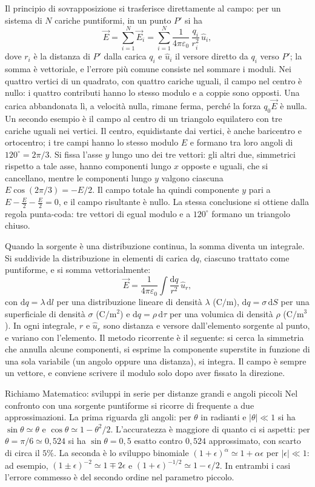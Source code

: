 \documentclass[11pt,a4paper]{article}
\newcommand{\dd}{\mathrm{d}}
\newcommand{\epz}{\varepsilon_0}
\newcommand{\Ev}{\vec{E}}
\newcommand{\uv}{\hat{u}}
\begin{document}
Il principio di sovrapposizione si trasferisce direttamente al campo: per un sistema di $N$ cariche puntiformi, in un punto $P'$ si ha
\[
\Ev=\sum_{i=1}^{N}\Ev_i=\sum_{i=1}^{N}\frac{1}{4\pi\epz}\,\frac{q_i}{r_i^2}\,\uv_i ,
\]
dove $r_i$ è la distanza di $P'$ dalla carica $q_i$ e $\uv_i$ il versore diretto da $q_i$ verso $P'$; la somma è vettoriale, e l'errore più comune consiste nel sommare i moduli. Nei quattro vertici di un quadrato, con quattro cariche uguali, il campo nel centro è nullo: i quattro contributi hanno lo stesso modulo e a coppie sono opposti. Una carica abbandonata lì, a velocità nulla, rimane ferma, perché la forza $q_0\Ev$ è nulla. Un secondo esempio è il campo al centro di un triangolo equilatero con tre cariche uguali nei vertici. Il centro, equidistante dai vertici, è anche baricentro e ortocentro; i tre campi hanno lo stesso modulo $E$ e formano tra loro angoli di $120^{\circ}=2\pi/3$. Si fissa l'asse $y$ lungo uno dei tre vettori: gli altri due, simmetrici rispetto a tale asse, hanno componenti lungo $x$ opposte e uguali, che si cancellano, mentre le componenti lungo $y$ valgono ciascuna $E\cos(2\pi/3)=-E/2$. Il campo totale ha quindi componente $y$ pari a $E-\tfrac E2-\tfrac E2=0$, e il campo risultante è nullo. La stessa conclusione si ottiene dalla regola punta-coda: tre vettori di egual modulo e a $120^{\circ}$ formano un triangolo chiuso.

Quando la sorgente è una distribuzione continua, la somma diventa un integrale. Si suddivide la distribuzione in elementi di carica $\dd q$, ciascuno trattato come puntiforme, e si somma vettorialmente:
\[
\Ev=\frac{1}{4\pi\epz}\int \frac{\dd q}{r^2}\,\uv_r ,
\]
con $\dd q=\lambda\,\dd l$ per una distribuzione lineare di densità $\lambda$ ($\ensuremath{\mathrm{C/m}}$), $\dd q=\sigma\,\dd S$ per una superficiale di densità $\sigma$ ($\ensuremath{\mathrm{C/m^2}}$) e $\dd q=\rho\,\dd\tau$ per una volumica di densità $\rho$ ($\ensuremath{\mathrm{C/m^3}}$). In ogni integrale, $r$ e $\uv_r$ sono distanza e versore dall'elemento sorgente al punto, e variano con l'elemento. Il metodo ricorrente è il seguente: si cerca la simmetria che annulla alcune componenti, si esprime la componente superstite in funzione di una sola variabile (un angolo oppure una distanza), si integra. Il campo è sempre un vettore, e conviene scrivere il modulo solo dopo aver fissato la direzione.

\begin{richiamo}{Richiamo Matematico: sviluppi in serie per distanze grandi e angoli piccoli}
Nel confronto con una sorgente puntiforme si ricorre di frequente a due approssimazioni. La prima riguarda gli angoli: per $\theta$ in radianti e $|\theta|\ll 1$ si ha $\sin\theta\simeq\theta$ e $\cos\theta\simeq 1-\theta^2/2$. L'accuratezza è maggiore di quanto ci si aspetti: per $\theta=\pi/6\simeq 0{,}524$ si ha $\sin\theta=0{,}5$ esatto contro $0{,}524$ approssimato, con scarto di circa il $5\%$. La seconda è lo sviluppo binomiale $(1+\epsilon)^{\alpha}\simeq 1+\alpha\epsilon$ per $|\epsilon|\ll 1$: ad esempio, $(1\pm\epsilon)^{-2}\simeq 1\mp2\epsilon$ e $(1+\epsilon)^{-1/2}\simeq 1-\epsilon/2$. In entrambi i casi l'errore commesso è del secondo ordine nel parametro piccolo.
\end{richiamo}
\end{document}
